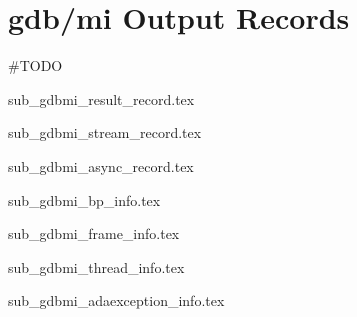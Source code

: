 \section{gdb/mi Output Records}

\#TODO

{sub_gdbmi_result_record.tex}

{sub_gdbmi_stream_record.tex}

{sub_gdbmi_async_record.tex}

{sub_gdbmi_bp_info.tex}

{sub_gdbmi_frame_info.tex}

{sub_gdbmi_thread_info.tex}

{sub_gdbmi_adaexception_info.tex}
